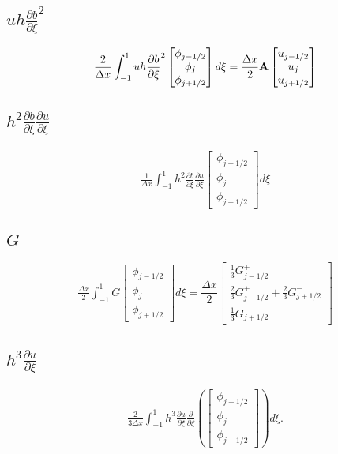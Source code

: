 \subsection{$uh \frac{\partial b}{\partial \xi}^2$}
\begin{equation*}
\frac{2}{\Delta x}\int_{-1 }^{1}uh \frac{\partial b}{\partial \xi}^2 \begin{bmatrix}
\phi_{j-1/2}\\\phi_j \\\phi_{j+1/2}
\end{bmatrix} d\xi = \frac{\Delta x}{2} \mathbf{A}   \begin{bmatrix}
u_{j-1/2}\\u_j \\u _{j+1/2}
\end{bmatrix}
\end{equation*}


\subsection{$h^2 \frac{\partial b}{\partial \xi}  \frac{\partial u }{\partial \xi}$}
\begin{multline*}
\frac{1}{\Delta x}\int_{-1 }^{1} h^2 \frac{\partial b}{\partial \xi}  \frac{\partial u }{\partial \xi} \begin{bmatrix}
\phi_{j-1/2}\\\phi_j \\\phi_{j+1/2} 
\end{bmatrix} d\xi
\end{multline*}

\subsection{$G$}
\begin{multline*}
\frac{\Delta x}{2}\int_{-1 }^{1} G \begin{bmatrix}
\phi_{j-1/2}\\\phi_j \\\phi_{j+1/2} 
\end{bmatrix} d\xi = \dfrac{\Delta x}{2} \begin{bmatrix}
\frac{1}{3} G_{j-1/2}^+\\\frac{2}{3} G_{j-1/2}^+ + \frac{2}{3} G_{j+1/2}^-\\ \frac{1}{3} G_{j+1/2}^-
\end{bmatrix}
\end{multline*}

\subsection{$h^3 \frac{\partial {u}}{\partial \xi}$}
\begin{multline*}
\frac{2}{3\Delta x}\int_{-1 }^{1} h^3 \frac{\partial {u}}{\partial \xi}  \frac{\partial}{\partial \xi}\left(\begin{bmatrix}
\phi_{j-1/2}\\\phi_j \\\phi_{j+1/2} 
\end{bmatrix} \right)d\xi.
\end{multline*}

